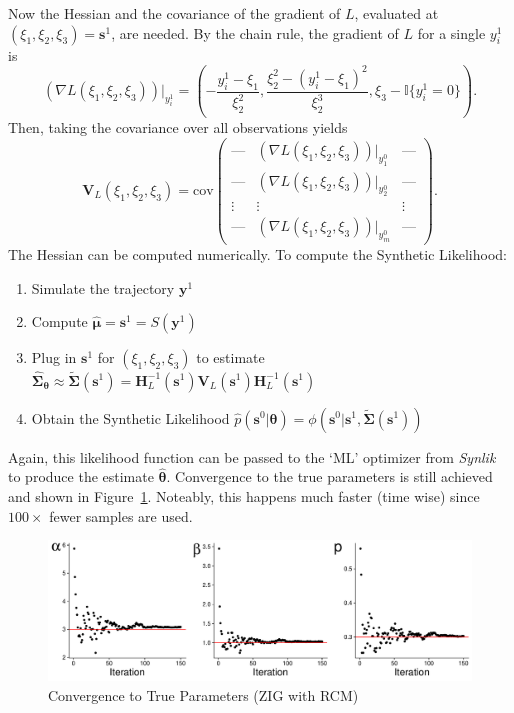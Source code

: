 Now the Hessian and the covariance of the gradient of $L$, evaluated at $(\xi_1, \xi_2, \xi_3) = \pmb{s}^1$, are needed. By the chain rule, the gradient of $L$ for a single $y^1_i$ is
\begin{equation}
(\nabla L(\xi_1, \xi_2, \xi_3))|_{y^1_i} = (-\frac{y_i^1 - \xi_1}{\xi_2^2}, \frac{\xi_2^2 - (y_i^1 - \xi_1)^2}{\xi_2^3},\xi_3 - \mathbb{I}\{y^1_i = 0\}).
\end{equation}
Then, taking the covariance over all observations yields
\begin{equation}
\pmb{V}_L(\xi_1, \xi_2, \xi_3) = \text{cov} \begin{pmatrix}
    \text{---} & (\nabla L(\xi_1, \xi_2, \xi_3))|_{y^0_1} & \text{---} \\
    \text{---} & (\nabla L(\xi_1, \xi_2, \xi_3))|_{y^0_2} & \text{---} \\
    \vdots & \vdots & \vdots \\
    \text{---} & (\nabla L(\xi_1, \xi_2, \xi_3))|_{y^0_m} & \text{---}
\end{pmatrix}.
\end{equation}
The Hessian can be computed numerically. To compute the Synthetic Likelihood:
\begin{enumerate}
    \item Simulate the trajectory $\pmb{y}^1$
    \item Compute $\hat{\pmb{\mu}} = \pmb{s}^1 = S(\pmb{y}^1)$
    \item Plug in $\pmb{s}^1$ for $(\xi_1, \xi_2, \xi_3)$ to estimate $\hat{\pmb{\Sigma}}_{\pmb{\theta}} \approx \tilde{\pmb{\Sigma}}(\pmb{s}^1) = \pmb{H}_L^{-1}(\pmb{s}^1) \pmb{V}_{L}(\pmb{s}^1) \pmb{H}_{L}^{-1}(\pmb{s}^1)$
    \item Obtain the Synthetic Likelihood $\hat{p}(\pmb{s}^0 | \pmb{\theta}) = \phi(\pmb{s}^0 | \pmb{s}^1, \tilde{\pmb{\Sigma}}(\pmb{s}^1))$
\end{enumerate}
Again, this likelihood function can be passed to the `ML' optimizer from \emph{Synlik} \citep{synlik_2014} to produce the estimate $\hat{\pmb{\theta}}$. Convergence to the true parameters is still achieved and shown in Figure~\ref{fig:robust_zig}. Noteably, this happens much faster (time wise) since $100 \times$ fewer samples are used.

\begin{figure}[H]
    \centering
    \includegraphics[width=12cm]{images/sl/gamma_example/robust_optimisation.pdf}
    \caption{Convergence to True Parameters (ZIG with RCM)}
    \label{fig:robust_zig}
\end{figure}

